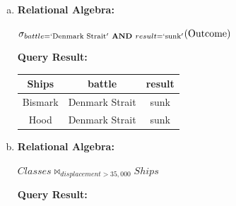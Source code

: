 \documentclass[12pt]{article}
\begin{document}
\begin{enumerate}
\begin{enumerate}[a)]
        \item

        \textbf{Relational Algebra:}

        \bigskip

        $\sigma_{battle=`\text{Denmark Strait}' \textbf{ AND } result=`\text{sunk}'}(\text{Outcome})$

        \bigskip

        \textbf{Query Result:}

        \bigskip

        \begin{tabular}{|c|c|c|}
            \hline
            Ships   &   battle  & result\\
            \hline
            Bismark &   Denmark Strait  & sunk\\
            \hline
            Hood    &   Denmark Strait  & sunk\\
            \hline
        \end{tabular}

        \item

        \textbf{Relational Algebra:}

        \bigskip

        $Classes \bowtie_{displacement > 35,000} Ships$

        \bigskip

        \textbf{Query Result:}

        \bigskip


\end{enumerate}
\end{enumerate}
\end{document}
